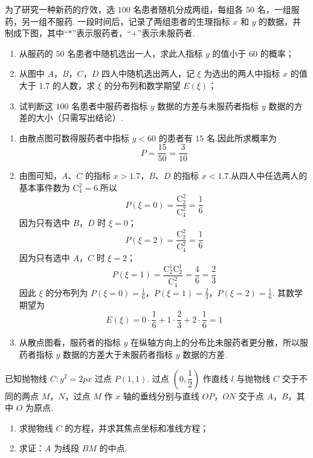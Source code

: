 \begin{problem}
为了研究一种新药的疗效，选 \(100\) 名患者随机分成两组，每组各 \(50\) 名，一组服药，另一组不服药. 一段时间后，记录了两组患者的生理指标 \(x\) 和 \(y\) 的数据，并制成下图，其中“\(*\)”表示服药者，“+”表示未服药者.

\begin{enumerate}
\item 从服药的 \(50\) 名患者中随机选出一人，求此人指标 \(y\) 的值小于 \(60\) 的概率；
\item 从图中 \(A\)，\(B\)，\(C\)，\(D\) 四人中随机选出两人，记 \(\xi\) 为选出的两人中指标 \(x\) 的值大于 \(1.7\) 的人数，求 \(\xi\) 的分布列和数学期望 \(E(\xi)\)；
\item 试判断这 \(100\) 名患者中服药者指标 \(y\) 数据的方差与未服药者指标 \(y\) 数据的方差的大小（只需写出结论）.
\end{enumerate}

\end{problem}

\begin{solution}
\begin{enumerate}
\item 由散点图可数得服药者中指标 \(y<60\) 的患者有 \(15\) 名.因此所求概率为
\[
P=\frac{15}{50}=\frac3{10}
\]

\item 由图可知，\(A\)、\(C\) 的指标 \(x>1.7\)，\(B\)、\(D\) 的指标 \(x<1.7\).从四人中任选两人的基本事件数为 \(\mathrm C_4^2=6\).所以
\[
P(\xi=0)=\frac{\mathrm C_2^2}{\mathrm C_4^2}=\frac16
\]
因为只有选中 \(B\)，\(D\) 时 \(\xi=0\)；
\[
P(\xi=2)=\frac{\mathrm C_2^2}{\mathrm C_4^2}=\frac16
\]
因为只有选中 \(A\)，\(C\) 时 \(\xi=2\)；
\[
P(\xi=1)=\frac{\mathrm C_2^1\mathrm C_2^1}{\mathrm C_4^2}=\frac46=\frac23
\]
因此 \(\xi\) 的分布列为
\(P(\xi=0)=\frac16\)，\(P(\xi=1)=\frac23\)，\(P(\xi=2)=\frac16\).
其数学期望为
\[
E(\xi)=0\cdot\frac16+1\cdot\frac23+2\cdot\frac16=1
\]

\item 从散点图看，服药者的指标 \(y\) 在纵轴方向上的分布比未服药者更分散，所以服药者指标 \(y\) 数据的方差大于未服药者指标 \(y\) 数据的方差.
\end{enumerate}
\end{solution}

\begin{problem}
已知抛物线 \(C:y^2=2px\) 过点 \(P(1,1)\). 过点 \(\left(0,\dfrac12\right)\) 作直线 \(l\) 与抛物线 \(C\) 交于不同的两点 \(M\)，\(N\)，过点 \(M\) 作 \(x\) 轴的垂线分别与直线 \(OP\)，\(ON\) 交于点 \(A\)，\(B\)，其中 \(O\) 为原点.

\begin{enumerate}
\item 求抛物线 \(C\) 的方程，并求其焦点坐标和准线方程；
\item 求证：\(A\) 为线段 \(BM\) 的中点.
\end{enumerate}
\end{problem}

